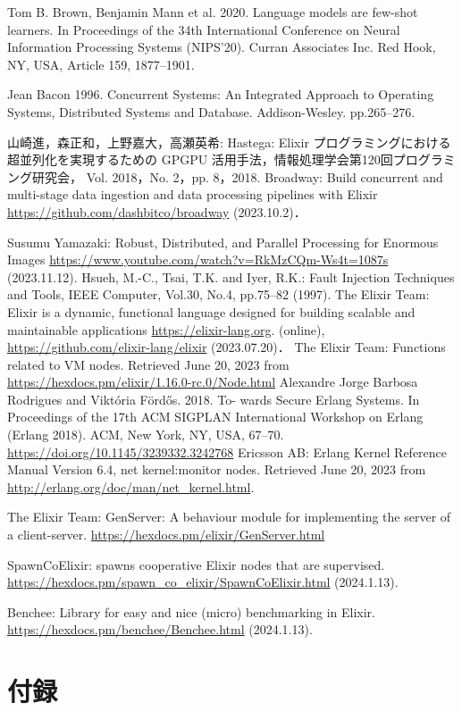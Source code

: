 \documentclass[a4paper]{jreport}	%
\begin{document}
\begin{thebibliography}{99}

Tom B. Brown, Benjamin Mann et al. 2020. Language models are few-shot learners. In Proceedings of the 34th International Conference on Neural Information Processing Systems (NIPS'20). Curran Associates Inc. Red Hook, NY, USA, Article 159, 1877--1901.

Jean Bacon 1996. Concurrent Systems: An Integrated Approach to Operating Systems, Distributed Systems and Database. Addison-Wesley. pp.265--276.

山崎進，森正和，上野嘉大，高瀬英希: Hastega: Elixir プログラミングにおける超並列化を実現するための GPGPU 活用手法，情報処理学会第120回プログラミング研究会， Vol. 2018，No. 2，pp. 8，2018.
Broadway: Build concurrent and multi-stage data ingestion and data processing pipelines with Elixir \url{https://github.com/dashbitco/broadway} (2023.10.2)．

Susumu Yamazaki: Robust, Distributed, and Parallel Processing for Enormous Images \url{https://www.youtube.com/watch?v=RkMzCQm-Ws4t=1087s} (2023.11.12).
Hsueh, M.-C., Tsai, T.K. and Iyer, R.K.: Fault Injection Techniques and Tools, IEEE Computer, Vol.30, No.4, pp.75--82 (1997).
The Elixir Team: Elixir is a dynamic, functional language designed for building scalable and maintainable applications \url{https://elixir-lang.org}. (online), \url{https://github.com/elixir-lang/elixir} (2023.07.20)．
The Elixir Team: Functions related to VM nodes. Retrieved June 20, 2023 from \url{https://hexdocs.pm/elixir/1.16.0-rc.0/Node.html}
Alexandre Jorge Barbosa Rodrigues and Viktória Fördős. 2018. To- wards Secure Erlang Systems. In Proceedings of the 17th ACM SIGPLAN International Workshop on Erlang (Erlang 2018). ACM, New York, NY, USA, 67--70. \url{https://doi.org/10.1145/3239332.3242768}
Ericsson AB: Erlang Kernel Reference Manual Version 6.4, net kernel:monitor nodes. Retrieved June 20, 2023 from \url{http://erlang.org/doc/man/net_kernel.html}.

The Elixir Team: GenServer: A behaviour module for implementing the server of a client-server. \url{https://hexdocs.pm/elixir/GenServer.html}  

SpawnCoElixir: spawns cooperative Elixir nodes that are supervised. \url{https://hexdocs.pm/spawn_co_elixir/SpawnCoElixir.html} (2024.1.13).

Benchee: Library for easy and nice (micro) benchmarking in Elixir.
\url{https://hexdocs.pm/benchee/Benchee.html} (2024.1.13).

\chapter*{付録}


\end{thebibliography}
\end{document}
